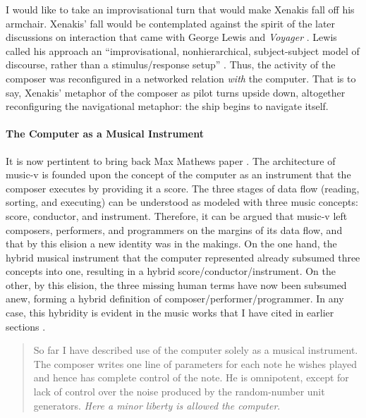I would like to take an improvisational turn that would make Xenakis fall off his armchair. Xenakis' fall would be contemplated against the spirit of the later discussions on interaction that came with George Lewis and \textit{Voyager} \parencite{Lew93:Put, Lew99:Int, Lew00:Too}. Lewis called his approach an ``improvisational, nonhierarchical, subject-subject model of discourse, rather than a stimulus/response setup'' \parencite[104]{Lew99:Int}. Thus, the activity of the composer was reconfigured in a networked relation \textit{with} the computer. That is to say, Xenakis' metaphor of the composer as pilot turns upside down, altogether reconfiguring the navigational metaphor: the ship begins to navigate itself.

\paragraph{The Computer as a Musical Instrument}
It is now pertintent to bring back Max Mathews paper  \parencite{Mat63:The}. The architecture of \gls{music-v} is founded upon the concept of the computer as an instrument that the composer executes by providing it a score. The three stages of data flow (reading, sorting, and executing) can be understood as modeled with three music concepts: score, conductor, and instrument. Therefore, it can be argued that \gls{music-v} left composers, performers, and programmers on the margins of its data flow, and that by this elision a new identity was in the makings. On the one hand, the hybrid musical instrument that the computer represented already subsumed three concepts into one, resulting in a hybrid score/conductor/instrument. On the other, by this elision, the three missing human terms have now been subsumed anew, forming a hybrid definition of composer/performer/programmer. In any case, this hybridity is evident in the music works that I have cited in earlier sections .

\begin{quote}
	So far I have described use of the computer solely as a musical instrument. The composer writes one line of parameters for each note he wishes played and hence has complete control of the note. He is omnipotent, except for lack of control over the noise produced by the random-number unit generators. \textit{Here a minor liberty is allowed the computer}. \im \parencite[557]{Mat63:The}
\end{quote}


